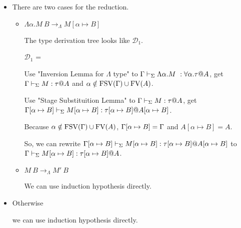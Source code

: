 \begin{itemize}
	\newcommand{\R}{\longrightarrow_{\Lambda}}
	\item \TIns
	      	      
	      There are two cases for the reduction.
	      \begin{itemize}
	      	\item $\Lambda\alpha.M\ B \R M[\alpha \mapsto B]$
	      	      	      	      
	      	      The type derivation tree looks like $\mathcal{D}_1$.
	      	      	      	      
	      	      $\mathcal{D}_1$ = 
	      	      {}
	      	      	      	      
	      	      Use "Inversion Lemma for $\Lambda$ type" to $\Gamma \vdash_\Sigma \Lambda\alpha.M\ : \forall\alpha.\tau @ A$,
	      	      get $\Gamma \vdash_\Sigma M : \tau @ A$ and $\alpha \notin \text{FSV}(\Gamma) \cup \text{FV}(A)$.
	      	      	      	      
	      	      Use "Stage Substituition Lemma" to $\Gamma \vdash_\Sigma M : \tau @ A$,
	      	      get $\Gamma[\alpha \mapsto B] \vdash_\Sigma M[\alpha \mapsto B] : \tau[\alpha \mapsto B] @ A[\alpha \mapsto B]$.
	      	      	      	      
	      	      Because $\alpha \notin \text{FSV}(\Gamma) \cup \text{FV}(A)$, $\Gamma[\alpha \mapsto B] = \Gamma$ and $A[\alpha \mapsto B] = A$.
	      	      	      	      
	      	      So, we can rewrite $\Gamma[\alpha \mapsto B] \vdash_\Sigma M[\alpha \mapsto B] : \tau[\alpha \mapsto B] @ A[\alpha \mapsto B]$ to
	      	      $\Gamma \vdash_\Sigma M[\alpha \mapsto B] : \tau[\alpha \mapsto B] @ A$.
	      	\item $M\ B \R M'\ B$
	      	      	      	      
	      	      We can use induction hypothesis directly.
	      \end{itemize}
	      	      
	\item Otherwise
	      	      
	      we can use induction hypothesis directly.
\end{itemize}


